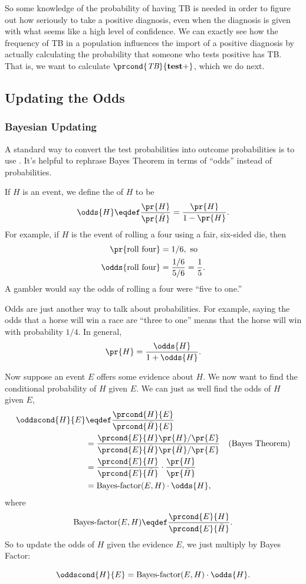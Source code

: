 So some knowledge of the probability of having TB is needed in order
to figure out how seriously to take a positive diagnosis, even when
the diagnosis is given with what seems like a high level of
confidence.  We can exactly see how the frequency of TB in a
population influences the import of a positive diagnosis by actually
calculating the probability that someone who tests positive has TB.
That is, we want to calculate $\prcond{\TB}{\testplus}$, which we do
next.

\subsection{Updating the Odds}

\subsubsection{Bayesian Updating}
A standard way to convert the test probabilities into outcome
probabilities is to use .  It's helpful to rephrase
Bayes Theorem in terms of ``odds'' instead of probabilities.

If $H$ is an event, we define the  of $H$ to be
\[
\odds{H} \eqdef \frac{\pr{H}}{\pr{\bar{H}}} = \frac{\pr{H}}{1-\pr{H}}.
\]
For example, if $H$ is the event of rolling a four using a fair,
six-sided die, then
\begin{align*}
\pr{\text{roll four}} & = 1/6,\text{ so}\\
\odds{\text{roll four}} & = \frac{1/6}{5/6} = \frac{1}{5}.
\end{align*}
A gambler would say the odds of rolling a four were ``five to one.''

Odds are just another way to talk about probabilities.  For example,
saying the odds that a horse will win a race are ``three to one''
means that the horse will win with probability $1/4$.  In general,
\[
\pr{H} = \frac{\odds{H}}{1 + \odds{H}}.
\]

Now suppose an event $E$ offers some evidence about $H$.  We now want
to find the conditional probability of $H$ given $E$.  We can just as
well find the odds of $H$ given $E$,
\begin{align*}
\oddscond{H}{E}
  & \eqdef \frac{\prcond{H}{E}}{\prcond{\bar{H}}{E}}\\
  & = \frac{\prcond{E}{H}\pr{H}/\pr{E}}{\prcond{E}{\bar{H}}\pr{\bar{H}}/\pr{E}}
          & \text{(Bayes Theorem)}\\
  & = \frac{\prcond{E}{H}}{\prcond{E}{\bar{H}}} \cdot \frac{\pr{H}}{\pr{\bar{H}}}\\
  & = \BF{E}{H} \cdot \odds{H},
\end{align*}
where
\[
\BF{E}{H} \eqdef \frac{\prcond{E}{H}}{\prcond{E}{\bar{H}}}.
\]
So to update the odds of $H$ given the evidence $E$, we just multiply
by Bayes Factor:
\begin{lemma}\label{BFlemma}
\[
\oddscond{H}{E} = \BF{E}{H} \cdot \odds{H}.
\]
\end{lemma}

